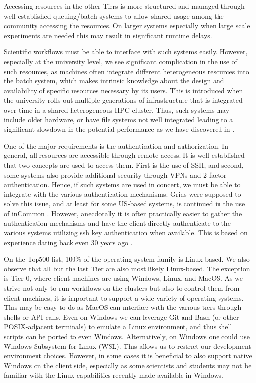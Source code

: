 \documentclass[sigconf]{acmart}
\begin{document}
Accessing resources in the other Tiers is more structured and managed through well-established queuing/batch systems to allow shared usage among the community accessing the resources. On larger systems especially when large scale experiments are needed this may result in significant runtime delays.

Scientific workflows must be able to interface with such systems easily. However, especially at the university level, we see significant complication in the use of such resources, as machines often integrate different heterogeneous resources into the batch system, which makes intrinsic knowledge about the design and availability of specific resources necessary by its users. This is introduced when the university rolls out multiple generations of infrastructure that is integrated over time in a shared heterogeneous HPC cluster. Thus, such systems may include older hardware, or have file systems not well integrated leading to a significant slowdown in the potential performance as we have discovered in \citep{las-frontiers-edu}. 


One of the major requirements is the authentication and authorization. In general, all resources are accessible through remote access. It is well established that two concepts are used to access them. First is the use of SSH, and second, some systems also provide additional security through VPNs and 2-factor authentication. Hence, if such systems are used in concert, we must be able to integrate with the various authentication mechanisms. Grids were supposed to solve this issue, and at least for some US-based systems, is continued in the use of inCommon \citep{incommon}. However, anecdotally it is often practically easier to gather the authentication mechanisms and have the client directly authenticate to the various systems utilizing ssh key authentication when available. This is based on experience dating back even 30 years ago \cite{las-99-loosely}.

On the Top500  list, 100\% of the operating system family is Linux-based. We also observe that all but the last Tier are also most likely Linux-based. The exception is Tier 0, where client machines are using Windows, Linux, and MacOS. As we strive not only to run workflows on the clusters but also to control them from client machines, it is important to support a wide variety of operating systems. This may be easy to do as MacOS can interface with the various tiers through shells or API calls. Even on Windows we can leverage Git and Bash (or other POSIX-adjacent terminals) to emulate a Linux environment, and thus shell scripts 
can be ported to even Windows. Alternatively, on Windows one could use Windows Subsystem for Linux (WSL). This allows us to restrict our development environment choices. However, in some cases it is beneficial to also support native Windows on the client side, especially as some scientists and students may not be familiar with the Linux capabilities recently made available in Windows.
\end{document}
